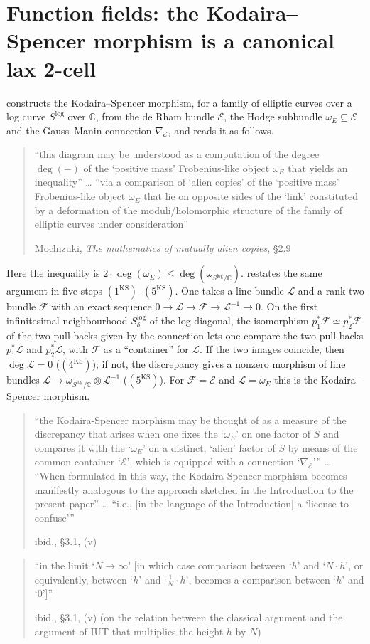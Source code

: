 \documentclass[11pt,a4paper]{article}
\numberwithin{table}{section}
\newcommand{\Fcal}{\mathcal{F}}
\newcommand{\Lcal}{\mathcal{L}}
\newcommand{\Ecal}{\mathcal{E}}
\newcommand{\KS}{\mathrm{KS}}
\newcommand{\lab}[2]{{\upshape\fcolorbox{#1}{#1!8}{\scriptsize\sffamily\bfseries\textcolor{#1}{#2}}}}
\newcommand{\tagS}{\lab{blue}{S}}
\newcommand{\q}[1]{``#1''}
\newcommand{\srcquote}[2]{\begin{quote}\small #1\par\nopagebreak\hfill{\footnotesize #2}\end{quote}}
\theoremstyle{plain}
\theoremstyle{definition}
\begin{document}
\section{Function fields: the Kodaira--Spencer morphism is a canonical lax 2-cell}
\tagS{} \cite[\S2.9]{Alien} constructs the Kodaira--Spencer morphism, for a family of elliptic curves over a log curve
$S^{\log}$ over $\mathbb C$, from the de Rham bundle $\Ecal$, the Hodge subbundle $\omega_E\subseteq\Ecal$ and the
Gauss--Manin connection $\nabla_{\Ecal}$, and reads it as follows.
\srcquote{\tagS{} \q{this diagram may be understood as a computation of the degree $\deg(-)$ of the `positive mass'
Frobenius-like object $\omega_E$ that yields an inequality} \dots{} \q{via a comparison of `alien copies' of the
`positive mass' Frobenius-like object $\omega_E$ that lie on opposite sides of the `link' constituted by a
deformation of the moduli/holomorphic structure of the family of elliptic curves under consideration}}{Mochizuki,
\emph{The mathematics of mutually alien copies}, \S2.9 \cite{Alien}}
Here the inequality is $2\cdot\deg(\omega_E)\le\deg(\omega_{S^{\log}/\mathbb C})$. \cite[\S3.1, (v)]{Alien} restates the
same argument in five steps $(1^{\KS})$--$(5^{\KS})$. One takes a line bundle $\Lcal$ and a rank two bundle $\Fcal$
with an exact sequence $0\to\Lcal\to\Fcal\to\Lcal^{-1}\to0$. On the first infinitesimal neighbourhood
$S^{\log}_\delta$ of the log diagonal, the isomorphism $p_1^*\Fcal\simeq p_2^*\Fcal$ of the two pull-backs given by the
connection lets one compare the two pull-backs $p_1^*\Lcal$ and $p_2^*\Lcal$, with $\Fcal$ as a ``container'' for
$\Lcal$. If the two images coincide, then $\deg\Lcal=0$ ($(4^{\KS})$); if not, the discrepancy gives a nonzero morphism
of line bundles $\Lcal\to\omega_{S^{\log}/\mathbb C}\otimes\Lcal^{-1}$ ($(5^{\KS})$). For $\Fcal=\Ecal$ and
$\Lcal=\omega_E$ this is the Kodaira--Spencer morphism.
\srcquote{\tagS{} \q{the Kodaira-Spencer morphism may be thought of as a measure of the discrepancy that arises when one
fixes the `$\omega_E$' on one factor of $S$ and compares it with the `$\omega_E$' on a distinct, `alien'
factor of $S$ by means of the common container `$\Ecal$', which is equipped with a connection
`$\nabla_{\Ecal}$'} \dots{} \q{When formulated in this way, the Kodaira-Spencer morphism becomes manifestly analogous to
the approach sketched in the Introduction to the present paper} \dots{} \q{i.e., [in the language of the
Introduction] a `license to confuse'}}{ibid., \S3.1, (v) \cite{Alien}}
\srcquote{\tagS{} \q{in the limit `$N\to\infty$' [in which case comparison between `$h$' and `$N\cdot h$',
or equivalently, between `$h$' and `$\frac1N\cdot h$', becomes a comparison between `$h$' and `$0$']}}%
{ibid., \S3.1, (v) (on the relation between the classical argument and the argument of IUT that multiplies the height
$h$ by $N$) \cite{Alien}}
\end{document}
